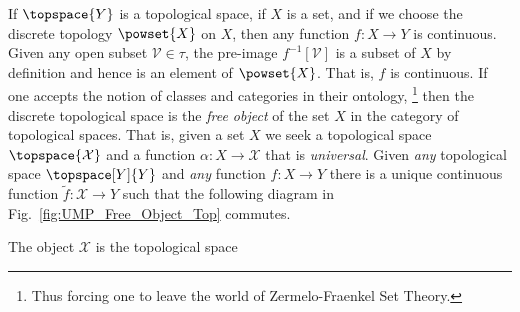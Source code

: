 \documentclass{book}                                                           %
\begin{document}
                \begin{example}
                    If $\topspace{Y}$ is a topological space, if $X$ is a set,
                    and if we choose the discrete topology $\powset{X}$ on $X$,
                    then any function $f:X\rightarrow{Y}$ is continuous. Given
                    any open subset $\mathcal{V}\in\tau$, the pre-image
                    $f^{\minus{1}}[\mathcal{V}]$ is a subset of $X$ by
                    definition and hence is an element of $\powset{X}$. That is,
                    $f$ is continuous. If one accepts the notion of classes and
                    categories in their ontology,%
                    \footnote{%
                        Thus forcing one to leave the world of Zermelo-Fraenkel
                        Set Theory.%
                    }
                    then the discrete topological space is the
                    \textit{free object} of the set $X$ in the category of
                    topological spaces. That is, given a set $X$ we seek a
                    topological space $\topspace{\mathcal{X}}$ and a function
                    $\alpha:X\rightarrow\mathcal{X}$ that is \textit{universal}.
                    Given \textit{any} topological space $\topspace[Y]{Y}$ and
                    \textit{any} function $f:X\rightarrow{Y}$ there is a unique
                    continuous function $\tilde{f}:\mathcal{X}\rightarrow{Y}$
                    such that the following diagram in Fig.~\ref{fig:UMP_Free_Object_Top}
                    commutes.
                    \par\hfill\par
                    \hfill
                    \begin{minipage}[t]{0.54\textwidth}
                        The object $\mathcal{X}$ is the topological space

\end{minipage}
\end{example}
\end{document}
